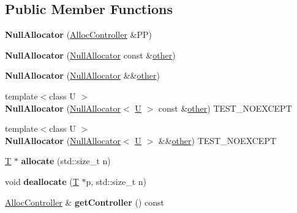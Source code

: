 \subsection*{Public Member Functions}
\begin{DoxyCompactItemize}
\item 
\mbox{\label{class_null_allocator_a61a8c522821fa6cfb1db098f65a15bf5}} 
{\bfseries Null\+Allocator} (\mbox{\hyperlink{struct_alloc_controller}{Alloc\+Controller}} \&PP)
\item 
\mbox{\label{class_null_allocator_a52a1729af273aeb92d97abb0a2f89a28}} 
{\bfseries Null\+Allocator} (\mbox{\hyperlink{class_null_allocator}{Null\+Allocator}} const \&\mbox{\hyperlink{structother}{other}})
\item 
\mbox{\label{class_null_allocator_a1651bc2b91e358b750ca34a10565e4c6}} 
{\bfseries Null\+Allocator} (\mbox{\hyperlink{class_null_allocator}{Null\+Allocator}} \&\&\mbox{\hyperlink{structother}{other}})
\item 
\mbox{\label{class_null_allocator_a30e0b5e95519d10134ec92bebaddf227}} 
{\footnotesize template$<$class U $>$ }\\{\bfseries Null\+Allocator} (\mbox{\hyperlink{class_null_allocator}{Null\+Allocator}}$<$ \mbox{\hyperlink{union_u}{U}} $>$ const \&\mbox{\hyperlink{structother}{other}}) T\+E\+S\+T\+\_\+\+N\+O\+E\+X\+C\+E\+PT
\item 
\mbox{\label{class_null_allocator_ad9584d5a7ee3b31361e770703c1051e8}} 
{\footnotesize template$<$class U $>$ }\\{\bfseries Null\+Allocator} (\mbox{\hyperlink{class_null_allocator}{Null\+Allocator}}$<$ \mbox{\hyperlink{union_u}{U}} $>$ \&\&\mbox{\hyperlink{structother}{other}}) T\+E\+S\+T\+\_\+\+N\+O\+E\+X\+C\+E\+PT
\item 
\mbox{\label{class_null_allocator_a47dbe2900c7ba0782d5e7a98f91844b1}} 
\mbox{\hyperlink{struct_t}{T}} $\ast$ {\bfseries allocate} (std\+::size\+\_\+t n)
\item 
\mbox{\label{class_null_allocator_a44ae6209e0e369a9d2ded1ef1bd6bd9f}} 
void {\bfseries deallocate} (\mbox{\hyperlink{struct_t}{T}} $\ast$p, std\+::size\+\_\+t n)
\item 
\mbox{\label{class_null_allocator_a779242121ea76fe4a748f0532acf2beb}} 
\mbox{\hyperlink{struct_alloc_controller}{Alloc\+Controller}} \& {\bfseries get\+Controller} () const
\end{DoxyCompactItemize}
